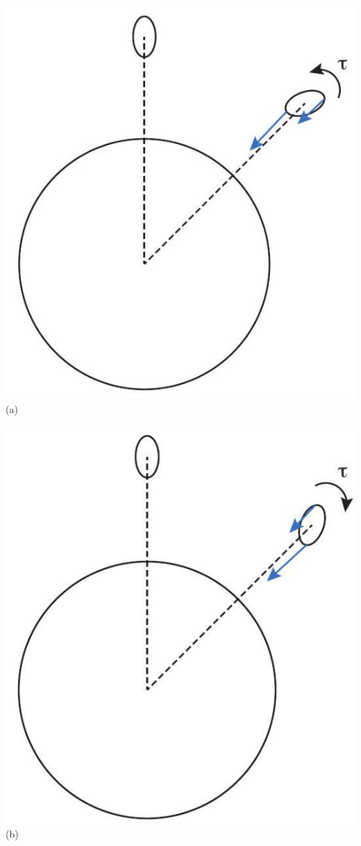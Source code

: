 \documentclass[10pt]{article}
\begin{document}
\includegraphics[max width=\textwidth, center]{2024_09_14_9969b06773f10b6936e8g-266}\\
(a)

\includegraphics[max width=\textwidth, center]{2024_09_14_9969b06773f10b6936e8g-266(1)}\\
(b)
\end{document}
